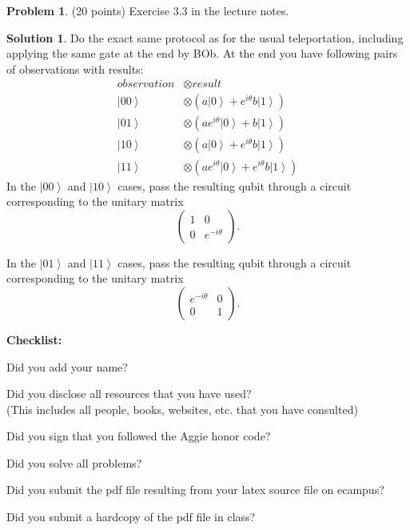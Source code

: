 \documentclass{article}
\theoremstyle{definition}
\newtheorem{problem}{Problem}
\newtheorem*{solution}{Solution}
\newcommand{\checklist}{\noindent\textbf{Checklist:}
\begin{compactitem}[$\Box$] 
\item Did you add your name? 
\item Did you disclose all resources that you have used? \\
(This includes all people, books, websites, etc. that you have consulted)
\item Did you sign that you followed the Aggie honor code? 
\item Did you solve all problems? 
\item Did you submit the pdf file resulting from your latex source
  file on ecampus? 
\item Did you submit a hardcopy of the pdf file in class? 
\end{compactitem}
}
\begin{document}
\begin{problem} (20 points)
Exercise 3.3 in the lecture notes. 
\end{problem}
\begin{solution}
Do the exact same protocol as for the usual teleportation, including applying the same gate at the end by BOb.  At the end you have following pairs of observations with results:
\begin{align*}
observation & \otimes result \\
\left| 00 \right\rangle & \otimes (a \left| 0 \right\rangle + e^{i\theta} b \left| 1 \right\rangle ) \\
\left| 01 \right\rangle & \otimes (a e^{i\theta} \left| 0 \right\rangle + b \left| 1 \right\rangle ) \\
\left| 10 \right\rangle & \otimes (a \left| 0 \right\rangle + e^{i\theta} b \left| 1 \right\rangle ) \\
\left| 11 \right\rangle & \otimes (a e^{i\theta} \left| 0 \right\rangle + e^{i\theta} b \left| 1 \right\rangle ) 
\end{align*}
In the $\left| 00 \right\rangle$ and $\left| 10 \right\rangle$ cases, pass the resulting qubit through a circuit corresponding to the 
unitary matrix
$$
\begin{pmatrix}
1 & 0 \\
0 & e^{-i\theta}
\end{pmatrix}.
$$


In the $\left| 01 \right\rangle$ and $\left| 11 \right\rangle$ cases, pass the resulting qubit through a circuit corresponding to the 
unitary matrix
$$
\begin{pmatrix}
e^{-i\theta} & 0 \\
0 & 1
\end{pmatrix}.
$$
\end{solution}









\goodbreak
\checklist
\end{document}

